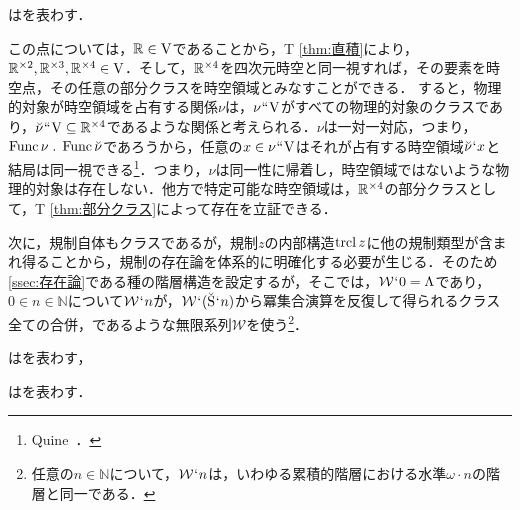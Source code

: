 \begin{df}
\label{df:クラスの内部構造}
\kagi{$
    \trcl\alpha
$}はを表わす．
\end{df}

\noindent この点については，$ \mathbb{R}\in\mathrm{V} $であることから，T \ref{thm:直積}により，$ \mathbb{R}^{\times 2},\mathbb{R}^{\times 3},\mathbb{R}^{\times 4}\in\mathrm{V} $．そして，$ \mathbb{R}^{\times 4} $を四次元時空と同一視すれば，その要素を時空点，その任意の部分クラスを時空領域とみなすことができる．
すると，物理的対象が時空領域を占有する関係$\nu$は，$\nu{\mspace{1mu}{``}\mspace{1mu}}\mathrm{V}$がすべての物理的対象のクラスであり，$\breve{\nu}{\mspace{1mu}{``}\mspace{1mu}}\mathrm{V}\subseteq\mathbb{R}^{\times 4}$であるような関係と考えられる．$\nu$は一対一対応，つまり，$ \func{\nu}\con{1}\func{\breve{\nu}} $であろうから，任意の$x\in\nu{\mspace{1mu}{``}\mspace{1mu}}\mathrm{V}$はそれが占有する時空領域$\breve{\nu}{\mspace{1mu}{`}\mspace{1mu}} x$と結局は同一視できる\footnote{
    Quine~\cite{Quine}．
}．つまり，$\nu$は同一性に帰着し，時空領域ではないような物理的対象は存在しない．他方で特定可能な時空領域は，$ \mathbb{R}^{\times 4} $の部分クラスとして，T \ref{thm:部分クラス}によって存在を立証できる．

次に，規制自体もクラスであるが，規制$z$の内部構造$\operatorname{trcl} z$に他の規制類型が含まれ得ることから，規制の存在論を体系的に明確化する必要が生じる．そのため\ref{ssec:存在論}である種の階層構造を設定するが，そこでは，$\mathcal{W}{\mspace{1mu}{`}\mspace{1mu}} 0 = \Lambda$であり，$ 0 \in n \in\mathbb{N}$について$\mathcal{W}{\mspace{1mu}{`}\mspace{1mu}} n$が，$\mathcal{W}{\mspace{1mu}{`}\mspace{1mu}} (\breve{\mathrm{S}}{\mspace{1mu}{`}\mspace{1mu}} n)$から冪集合演算を反復して得られるクラス全ての合併，であるような無限系列$\mathcal{W}$を使う\footnote{
    任意の$n\in\mathbb{N}$について，$ \mathcal{W}{\mspace{1mu}{`}\mspace{1mu}} n $は，いわゆる累積的階層における水準$ \omega\cdot n $の階層と同一である．
}．

\begin{df}
\label{df:冪集合演算}
はを表わす，
\end{df}

\begin{df}
\label{df:階層構造}
はを表わす．
\end{df}

